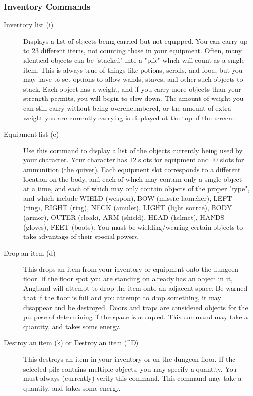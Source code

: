 \subsubsection{Inventory Commands}
\begin{description}

\item[Inventory list (i)] Displays a list of objects being carried but not
  equipped. You can carry up to 23 different items, not counting
  those in your equipment. Often, many identical objects can be
  "stacked" into a "pile" which will count as a single item. This
  is always true of things like potions, scrolls, and food, but
  you may have to set options to allow wands, staves, and other
  such objects to stack. Each object has a weight, and if you
  carry more objects than your strength permits, you will begin to
  slow down. The amount of weight you can still carry without
  being overencumbered, or the amount of extra weight you are
  currently carrying is displayed at the top of the screen.
 
\item[Equipment list (e)] Use this command to display a list of the
  objects currently being used by your character. Your character has
  12 slots for equipment and 10 slots for ammunition (the quiver).
  Each equipment slot corresponds to a different location on the body,
  and each of which may contain only a single object at a time, and
  each of which may only contain objects of the proper "type", and
  which include WIELD (weapon), BOW (missile launcher), LEFT (ring),
  RIGHT (ring), NECK (amulet), LIGHT (light source), BODY (armor),
  OUTER (cloak), ARM (shield), HEAD (helmet), HANDS (gloves), FEET
  (boots). You must be wielding/wearing certain objects to take
  advantage of their special powers.

\item[Drop an item (d)] This drops an item from your inventory or
  equipment onto the dungeon floor. If the floor spot you are standing
  on already has an object in it, Angband will attempt to drop the
  item onto an adjacent space. Be warned that if the floor is full and
  you attempt to drop something, it may disappear and be destroyed.
  Doors and traps are considered objects for the purpose of
  determining if the space is occupied. This command may take a
  quantity, and takes some energy.

\item[Destroy an item (k) or Destroy an item (\^{}D)] This destroys an item
  in your inventory or on the dungeon floor.  If the selected pile
  contains multiple objects, you may specify a quantity. You must
  always (currently) verify this command. This command may take a
  quantity, and takes some energy.


\end{description}

